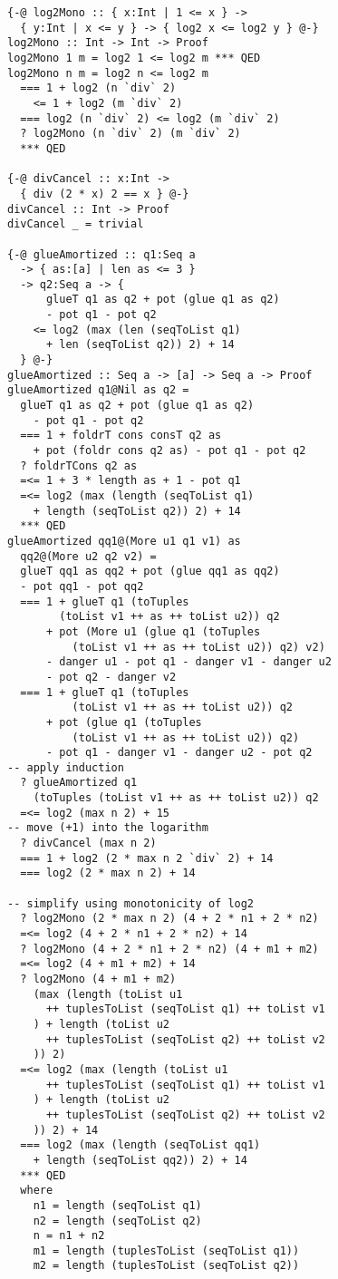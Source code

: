 \documentclass[sigplan,screen]{acmart}
\begin{document}
\begin{lstlisting}
{-@ log2Mono :: { x:Int | 1 <= x } ->
  { y:Int | x <= y } -> { log2 x <= log2 y } @-}
log2Mono :: Int -> Int -> Proof
log2Mono 1 m = log2 1 <= log2 m *** QED
log2Mono n m = log2 n <= log2 m
  === 1 + log2 (n `div` 2)
    <= 1 + log2 (m `div` 2)
  === log2 (n `div` 2) <= log2 (m `div` 2)
  ? log2Mono (n `div` 2) (m `div` 2)
  *** QED

{-@ divCancel :: x:Int ->
  { div (2 * x) 2 == x } @-}
divCancel :: Int -> Proof
divCancel _ = trivial

{-@ glueAmortized :: q1:Seq a
  -> { as:[a] | len as <= 3 }
  -> q2:Seq a -> {
      glueT q1 as q2 + pot (glue q1 as q2)
      - pot q1 - pot q2
    <= log2 (max (len (seqToList q1)
      + len (seqToList q2)) 2) + 14
  } @-}
glueAmortized :: Seq a -> [a] -> Seq a -> Proof
glueAmortized q1@Nil as q2 =
  glueT q1 as q2 + pot (glue q1 as q2)
    - pot q1 - pot q2
  === 1 + foldrT cons consT q2 as
    + pot (foldr cons q2 as) - pot q1 - pot q2
  ? foldrTCons q2 as
  =<= 1 + 3 * length as + 1 - pot q1
  =<= log2 (max (length (seqToList q1)
    + length (seqToList q2)) 2) + 14
  *** QED
glueAmortized qq1@(More u1 q1 v1) as
  qq2@(More u2 q2 v2) =
  glueT qq1 as qq2 + pot (glue qq1 as qq2)
  - pot qq1 - pot qq2
  === 1 + glueT q1 (toTuples
        (toList v1 ++ as ++ toList u2)) q2
      + pot (More u1 (glue q1 (toTuples
          (toList v1 ++ as ++ toList u2)) q2) v2)
      - danger u1 - pot q1 - danger v1 - danger u2
      - pot q2 - danger v2
  === 1 + glueT q1 (toTuples
          (toList v1 ++ as ++ toList u2)) q2
      + pot (glue q1 (toTuples
          (toList v1 ++ as ++ toList u2)) q2)
      - pot q1 - danger v1 - danger u2 - pot q2
-- apply induction
  ? glueAmortized q1
    (toTuples (toList v1 ++ as ++ toList u2)) q2
  =<= log2 (max n 2) + 15
-- move (+1) into the logarithm
  ? divCancel (max n 2)
  === 1 + log2 (2 * max n 2 `div` 2) + 14
  === log2 (2 * max n 2) + 14

-- simplify using monotonicity of log2
  ? log2Mono (2 * max n 2) (4 + 2 * n1 + 2 * n2)
  =<= log2 (4 + 2 * n1 + 2 * n2) + 14
  ? log2Mono (4 + 2 * n1 + 2 * n2) (4 + m1 + m2)
  =<= log2 (4 + m1 + m2) + 14
  ? log2Mono (4 + m1 + m2)
    (max (length (toList u1
      ++ tuplesToList (seqToList q1) ++ toList v1
    ) + length (toList u2
      ++ tuplesToList (seqToList q2) ++ toList v2
    )) 2)
  =<= log2 (max (length (toList u1
      ++ tuplesToList (seqToList q1) ++ toList v1
    ) + length (toList u2
      ++ tuplesToList (seqToList q2) ++ toList v2
    )) 2) + 14
  === log2 (max (length (seqToList qq1)
    + length (seqToList qq2)) 2) + 14
  *** QED
  where
    n1 = length (seqToList q1)
    n2 = length (seqToList q2)
    n = n1 + n2
    m1 = length (tuplesToList (seqToList q1))
    m2 = length (tuplesToList (seqToList q2))
\end{lstlisting}
\end{document}

